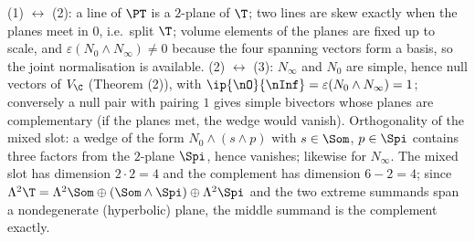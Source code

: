 (1) $\leftrightarrow$ (2): a line of $\PT$ is a $2$-plane of $\T$; two lines are skew exactly when the planes meet in $0$, i.e.\ split $\T$; volume elements of the planes are fixed up to scale, and $\varepsilon(N_0\wedge N_\infty) \neq 0$ because the four spanning vectors form a basis, so the joint normalisation is available. (2) $\leftrightarrow$ (3): $N_\infty$ and $N_0$ are simple, hence null vectors of $V_\C$ (Theorem (2)), with $\ip{\nO}{\nInf} = \varepsilon(N_0\wedge N_\infty) = 1$; conversely a null pair with pairing $1$ gives simple bivectors whose planes are complementary (if the planes met, the wedge would vanish). Orthogonality of the mixed slot: a wedge of the form $N_0 \wedge (s\wedge p)$ with $s \in \Som$, $p \in \Spi$ contains three factors from the $2$-plane $\Spi$, hence vanishes; likewise for $N_\infty$. The mixed slot has dimension $2 \cdot 2 = 4$ and the complement has dimension $6 - 2 = 4$; since $\Lambda^2\T = \Lambda^2\Som \oplus (\Som\wedge\Spi) \oplus \Lambda^2\Spi$ and the two extreme summands span a nondegenerate (hyperbolic) plane, the middle summand is the complement exactly.
